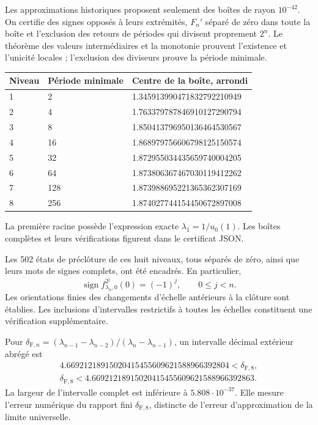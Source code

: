 Les approximations historiques proposent seulement des boîtes de rayon \(10^{-42}\). On certifie des signes opposés à leurs extrémités, \(F_n'\) séparé de zéro dans toute la boîte et l’exclusion des retours de périodes qui divisent proprement \(2^n\). Le théorème des valeurs intermédiaires et la monotonie prouvent l’existence et l’unicité locales ; l’exclusion des diviseurs prouve la période minimale.

\begingroup\small
\begin{longtable}{p{.12\linewidth}p{.17\linewidth}p{.62\linewidth}}
\hline
Niveau & Période minimale & Centre de la boîte, arrondi \\
\hline
1 & 2 & 1.345913990471832792210949 \\
2 & 4 & 1.763379787846910127290794 \\
3 & 8 & 1.850413796950136464530567 \\
4 & 16 & 1.868979756606798125150574 \\
5 & 32 & 1.872955034435659740004205 \\
6 & 64 & 1.873806367467030119412262 \\
7 & 128 & 1.873988695221365362307169 \\
8 & 256 & 1.874027744154450672897008 \\
\hline\end{longtable}
\endgroup

La première racine possède l’expression exacte \(\lambda_1=1/u_0(1)\). Les boîtes complètes et leurs vérifications figurent dans le certificat JSON.

Les 502 états de préclôture de ces huit niveaux, tous séparés de zéro, ainsi que leurs mots de signes complets, ont été encadrés. En particulier,
\[
\operatorname{sign}f_{\lambda_n,0}^{2^j}(0)=(-1)^j,\qquad0\le j<n.
\]
Les orientations finies des changements d’échelle antérieurs à la clôture sont établies. Les inclusions d’intervalles restrictifs à toutes les échelles constituent une vérification supplémentaire.

Pour \(\delta_{\mathrm F,n}=(\lambda_{n-1}-\lambda_{n-2})/(\lambda_n-\lambda_{n-1})\), un intervalle décimal extérieur abrégé est
\[
\boxed{\begin{gathered}
4.66921218915020415455609621588966392804<\delta_{\mathrm F,8},\\
\delta_{\mathrm F,8}<4.66921218915020415455609621588966392863.
\end{gathered}}
\]
La largeur de l’intervalle complet est inférieure à \(5.808\cdot10^{-37}\). Elle mesure l’erreur numérique du rapport fini \(\delta_{\mathrm F,8}\), distincte de l’erreur d’approximation de la limite universelle.


